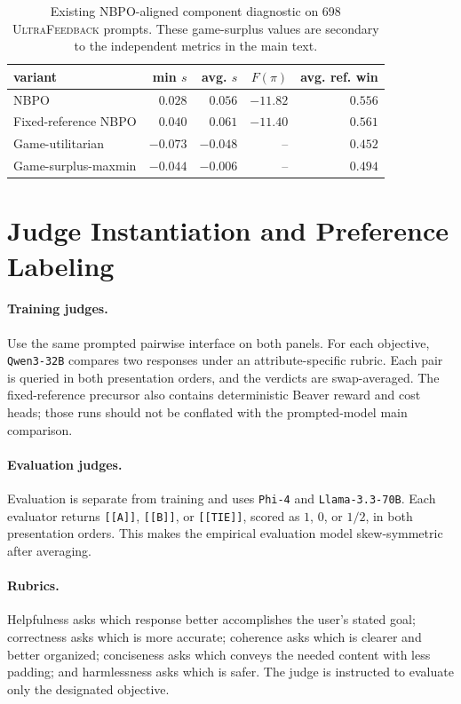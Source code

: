 \documentclass{article}
\theoremstyle{remark}
\theoremstyle{plain}
\newcommand{\NBPO}{\textsc{NBPO}}
\begin{document}
\begin{table}[t]
\centering\footnotesize
\setlength{\tabcolsep}{3.0pt}
\caption{Existing NBPO-aligned component diagnostic on 698 \textsc{UltraFeedback} prompts. These game-surplus values are secondary to the independent metrics in the main text.}
\label{tab:component-game-diagnostic}
\begin{tabular}{lrrrr}
\toprule
variant & min $s$ & avg. $s$ & $F(\pi)$ & avg. ref. win\\
\midrule
\NBPO{} & $0.028$ & $0.056$ & $-11.82$ & $0.556$\\
Fixed-reference NBPO & $0.040$ & $0.061$ & $-11.40$ & $0.561$\\
Game-utilitarian & $-0.073$ & $-0.048$ & -- & $0.452$\\
Game-surplus-maxmin & $-0.044$ & $-0.006$ & -- & $0.494$\\
\bottomrule
\end{tabular}
\end{table}

\section{Judge Instantiation and Preference Labeling}
\label{app:labeling}
\paragraph{Training judges.}
Use the same prompted pairwise interface on both panels. For each objective, \texttt{Qwen3-32B} compares two responses under an attribute-specific rubric. Each pair is queried in both presentation orders, and the verdicts are swap-averaged. The fixed-reference precursor also contains deterministic Beaver reward and cost heads; those runs should not be conflated with the prompted-model main comparison.

\paragraph{Evaluation judges.}
Evaluation is separate from training and uses \texttt{Phi-4} and \texttt{Llama-3.3-70B}. Each evaluator returns \texttt{[[A]]}, \texttt{[[B]]}, or \texttt{[[TIE]]}, scored as $1$, $0$, or $1/2$, in both presentation orders. This makes the empirical evaluation model skew-symmetric after averaging.

\paragraph{Rubrics.}
Helpfulness asks which response better accomplishes the user's stated goal; correctness asks which is more accurate; coherence asks which is clearer and better organized; conciseness asks which conveys the needed content with less padding; and harmlessness asks which is safer. The judge is instructed to evaluate only the designated objective.
\end{document}
